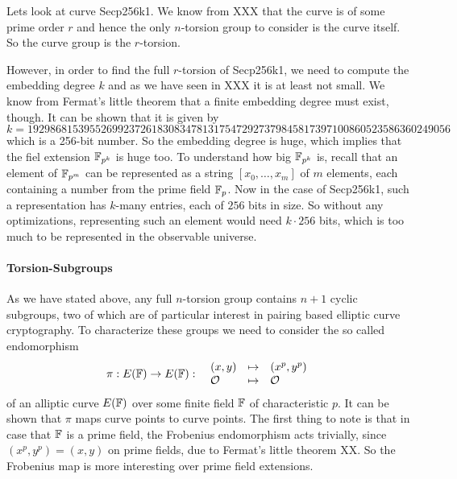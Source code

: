 \begin{example} 
Lets look at curve Secp256k1. We know from XXX that the curve is of some prime order $r$ and hence the only $n$-torsion group to consider is the curve itself. So the curve group is the $r$-torsion. 

However, in order to find the full $r$-torsion of Secp256k1, we need to compute the embedding degree $k$ and as we have seen in XXX it is at least not small. We know from Fermat's little theorem that a finite embedding degree must exist, though. It can be shown that it is given by
$$
k = \scriptstyle 192986815395526992372618308347813175472927379845817397100860523586360249056 
$$
which is a 256-bit number. So the embedding degree is huge, which implies that the fiel extension $\mathbb{F}_{p^k}$ is huge too. To understand how big $\mathbb{F}_{p^k}$ is, recall that an element of $\mathbb{F}_{p^m}$ can be represented as a string $[x_0,\ldots,x_m]$ of $m$ elements, each containing a number from the prime field $\mathbb{F}_p$. Now in the case of Secp256k1, such a representation has $k$-many entries, each of $256$ bits in size. So without any optimizations, representing such an element would need $k\cdot 256$ bits, which is too much to be represented in the observable universe.
\end{example}
\paragraph{Torsion-Subgroups}As we have stated above, any full $n$-torsion group contains $n+1$ cyclic subgroups, two of which are of particular interest in pairing based elliptic curve cryptography. To characterize these groups we need to consider the so called  endomorphism
\begin{equation}
\pi : E(\mathbb{F}) \to E(\mathbb{F}): \;\; 
\begin{array}{lcl}
(x,y)       &\mapsto & (x^p,y^p)\\
\mathcal{O} &\mapsto & \mathcal{O}
\end{array} 
\end{equation}
of an alliptic curve $E(\mathbb{F})$ over some finite field $\mathbb{F}$ of characteristic $p$. It can be shown that $\pi$ maps curve points to curve points. The first thing to note is that in case that $\mathbb{F}$ is a prime field, the Frobenius endomorphism acts trivially, since $(x^p,y^p) = (x,y)$ on prime fields, due to Fermat's little theorem XX. So the Frobenius map is more interesting over prime field extensions.

